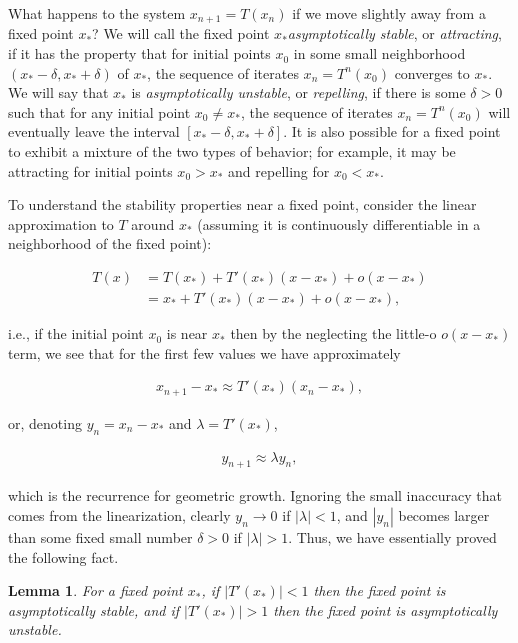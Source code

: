 \documentclass[11pt]{report}
\theoremstyle{plain}
\newtheorem{lem}[thm]{Lemma}
\theoremstyle{definition}
\begin{document}
What happens to the system $x_{n+1}=T(x_n)$ if we move
slightly away from a fixed point $x_*$? We will call
the fixed point $x_*$\emph{asymptotically stable}, or
\emph{attracting}, if it has the property that for initial
points $x_0$ in some small neighborhood
$(x_*-\delta, x_*+\delta)$ of $x_*$, the sequence of
iterates $x_n = T^n(x_0)$ converges to $x_*$. We will
say that $x_*$ is \emph{asymptotically unstable}, or
\emph{repelling}, if there is some $\delta>0$ such that for
any initial point $x_0\neq x_*$, the sequence of
iterates $x_n=T^n(x_0)$ will eventually leave the
interval $[x_*-\delta,x_*+\delta]$. It is also
possible for a fixed point to exhibit a mixture of the
two types of behavior; for example, it may be
attracting for initial points $x_0>x_*$ and repelling
for $x_0<x_*$.

To understand the stability properties near a fixed
point, consider the linear approximation to $T$ around
$x_*$ (assuming it is continuously differentiable in a
neighborhood of the fixed point):

\begin{align*}
T(x) &= T(x_*) + T'(x_*) (x-x_*) + o(x-x_*) \\ &= x_* + T'(x_*) (x-x_*) + o(x-x_*),
\end{align*}

\noindent i.e., if the initial point $x_0$ is near $x_*$ then by
the neglecting the little-o $o(x-x_*)$ term, we see
that for the first few values we have approximately

\begin{align*}
x_{n+1} - x_* \approx T'(x_*) (x_n-x_*),
\end{align*}

\noindent or, denoting $y_n = x_n-x_*$ and $\lambda=T'(x_*)$,

\begin{align*}
y_{n+1} \approx \lambda y_n,
\end{align*}

\noindent which is the recurrence for geometric growth. Ignoring
the small inaccuracy that comes from the
linearization, clearly $y_n\to 0$ if $|\lambda|<1$,
and $|y_n|$ becomes larger than some fixed small
number $\delta>0$ if $|\lambda|>1$. Thus, we have
essentially proved the following fact.

\begin{lem}
\label{lem-fixedpoint-stability}
For a fixed point $x_*$, if $|T'(x_*)|<1$ then the
fixed point is asymptotically stable, and if
$|T'(x_*)|>1$ then the fixed point is asymptotically
unstable.
\end{lem}
\end{document}
